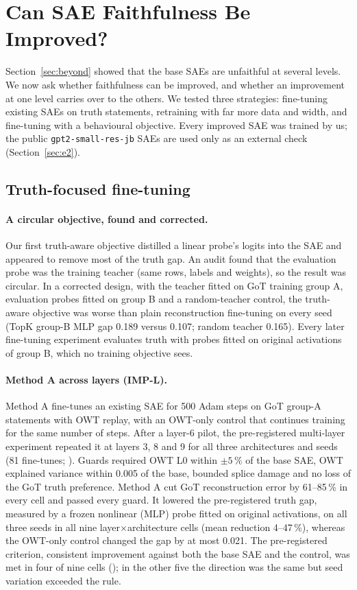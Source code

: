\section{Can SAE Faithfulness Be Improved?}\label{sec:improve}

Section~\ref{sec:beyond} showed that the base SAEs are unfaithful at several levels. We now ask whether faithfulness
can be improved, and whether an improvement at one level carries over to the others. We tested three strategies:
fine-tuning existing SAEs on truth statements, retraining with far more data and width, and fine-tuning with a
behavioural objective. Every improved SAE was trained by us; the public \texttt{gpt2-small-res-jb} SAEs are used only
as an external check (Section~\ref{sec:e2}).

\subsection{Truth-focused fine-tuning}\label{sec:finetune}

\paragraph{A circular objective, found and corrected.} Our first truth-aware objective distilled a linear probe's
logits into the SAE and appeared to remove most of the truth gap. An audit found that the evaluation probe was the
training teacher (same rows, labels and weights), so the result was circular. In a corrected design, with the teacher
fitted on GoT training group A, evaluation probes fitted on group B and a random-teacher control, the truth-aware
objective was worse than plain reconstruction fine-tuning on every seed (TopK group-B MLP gap 0.189 versus 0.107;
random teacher 0.165). Every later fine-tuning experiment evaluates truth with probes fitted on original activations of
group B, which no training objective sees.

\paragraph{Method A across layers (IMP-L).} Method A fine-tunes an existing SAE for 500 Adam steps on GoT group-A
statements with OWT replay, with an OWT-only control that continues training for the same number of steps. After a
layer-6 pilot, the pre-registered multi-layer experiment repeated it at layers 3, 8 and 9 for all three architectures
and seeds (81 fine-tunes; ). Guards required OWT L0 within $\pm5\,\%$ of the base SAE, OWT explained
variance within 0.005 of the base, bounded splice damage and no loss of the GoT truth preference. Method A cut GoT
reconstruction error by 61--85\,\% in every cell and passed every guard. It lowered the pre-registered truth gap,
measured by a frozen nonlinear (MLP) probe fitted on original activations, on all three seeds in all nine
layer$\times$architecture cells (mean reduction 4--47\,\%), whereas the OWT-only control changed the gap by at most 0.021.
The pre-registered criterion, consistent improvement against both the base SAE and the control, was met in four of
nine cells (); in the other five the direction was the same but seed variation
exceeded the rule.

